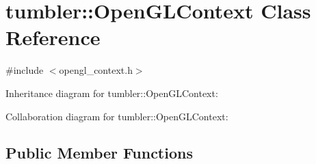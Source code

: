 \hypertarget{classtumbler_1_1_open_g_l_context}{\section{tumbler\+:\+:Open\+G\+L\+Context Class Reference}
\label{classtumbler_1_1_open_g_l_context}
}


{\ttfamily \#include $<$opengl\+\_\+context.\+h$>$}



Inheritance diagram for tumbler\+:\+:Open\+G\+L\+Context\+:


Collaboration diagram for tumbler\+:\+:Open\+G\+L\+Context\+:
\subsection*{Public Member Functions}
